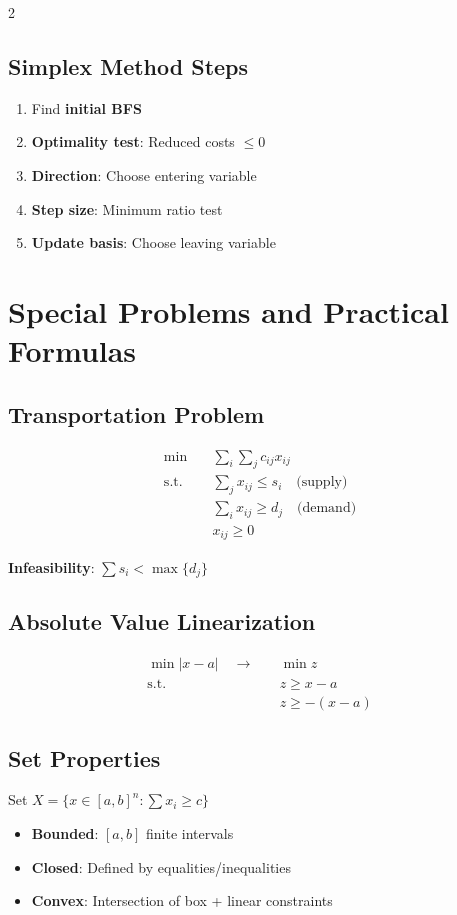 \documentclass[10pt,a4paper,landscape]{article}
\begin{document}
\begin{multicols}{2}
\subsection*{Simplex Method Steps}
\begin{enumerate}
\item Find \textbf{initial BFS}
\item \textbf{Optimality test}: Reduced costs $\leq 0$
\item \textbf{Direction}: Choose entering variable
\item \textbf{Step size}: Minimum ratio test
\item \textbf{Update basis}: Choose leaving variable
\end{enumerate}

\columnbreak

\section*{Special Problems and Practical Formulas}

\subsection*{Transportation Problem}
\begin{align}
\min \quad & \sum_i \sum_j c_{ij} x_{ij} \\
\text{s.t.} \quad & \sum_j x_{ij} \leq s_i \quad \text{(supply)} \\
& \sum_i x_{ij} \geq d_j \quad \text{(demand)} \\
& x_{ij} \geq 0
\end{align}

\textbf{Infeasibility}: $\sum s_i < \max\{d_j\}$

\subsection*{Absolute Value Linearization}
\begin{align}
\min |x - a| \quad \rightarrow \quad & \min z \\
\text{s.t.} \quad & z \geq x - a \\
& z \geq -(x - a)
\end{align}

\subsection*{Set Properties}
Set $X = \{x \in [a,b]^n : \sum x_i \geq c\}$
\begin{itemize}
\item \textbf{Bounded}: $[a,b]$ finite intervals
\item \textbf{Closed}: Defined by equalities/inequalities
\item \textbf{Convex}: Intersection of box + linear constraints
\end{itemize}


\end{multicols}
\end{document}
